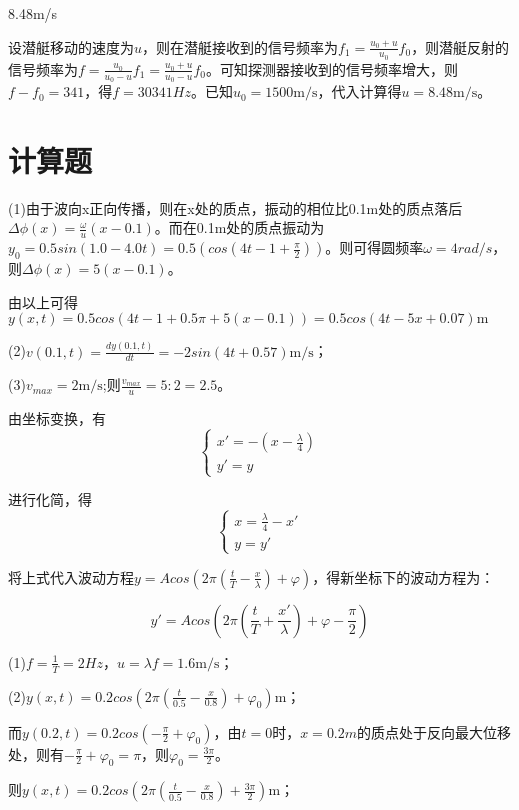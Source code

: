 \exercise 8.48m/s

\solve 设潜艇移动的速度为$u$，则在潜艇接收到的信号频率为$f_1=\frac{u_0+u}{u_0}f_0$，则潜艇反射的信号频率为$f=\frac{u_0}{u_0-u}f_1=\frac{u_0+u}{u_0-u}f_0$。可知探测器接收到的信号频率增大，则$f-f_0=341$，得$f=30341Hz$。已知$u_0=1500\mathrm{m/s}$，代入计算得$u=8.48\mathrm{m/s}$。


\section{计算题}
\exercise

\solve (1)由于波向x正向传播，则在x处的质点，振动的相位比0.1m处的质点落后$\Delta \phi(x)=\frac{\omega}{u}(x-0.1)$。而在0.1m处的质点振动为$y_0=0.5sin(1.0-4.0t)=0.5(cos(4t-1+\frac{\pi}{2}))$。则可得圆频率$\omega=4rad/s$，则$\Delta \phi(x)=5(x-0.1)$。

由以上可得$y(x,t)=0.5cos(4t-1+0.5\pi+5(x-0.1))=0.5cos(4t-5x+0.07)\mathrm{m}$

(2)$v(0.1,t)=\frac{d y(0.1,t)}{d t}=-2sin(4t+0.57)\mathrm{m/s}$；

(3)$v_{max}=2\mathrm{m/s}$;则$\frac{v_{max}}{u}=5:2=2.5$。

\exercise 

\solve 由坐标变换，有
\[
\begin{cases}
	x'=-(x-\frac{\lambda}{4})\\
	y'=y
\end{cases}
\]

进行化简，得
\[
\begin{cases}
	x=\frac{\lambda}{4}-x'\\
	y=y'
\end{cases}
\]

将上式代入波动方程$y=Acos(2\pi(\frac{t}{T}-\frac{x}{\lambda})+\varphi)$，得新坐标下的波动方程为：

$$y'=Acos(2\pi(\frac{t}{T}+\frac{x'}{\lambda})+\varphi-\frac{\pi}{2})$$

\exercise

\solve (1)$f=\frac{1}{T}=2Hz$，$u=\lambda f=1.6\mathrm{m/s}$；

(2)$y(x,t)=0.2cos(2\pi(\frac{t}{0.5}-\frac{x}{0.8})+\varphi_0)\mathrm{m}$；

而$y(0.2,t)=0.2cos(-\frac{\pi}{2}+\varphi_0)$，由$t=0$时，$x=0.2m$的质点处于反向最大位移处，则有$-\frac{\pi}{2}+\varphi_0=\pi$，则$\varphi_0=\frac{3\pi}{2}$。

则$y(x,t)=0.2cos(2\pi(\frac{t}{0.5}-\frac{x}{0.8})+\frac{3\pi}{2})\mathrm{m}$；

